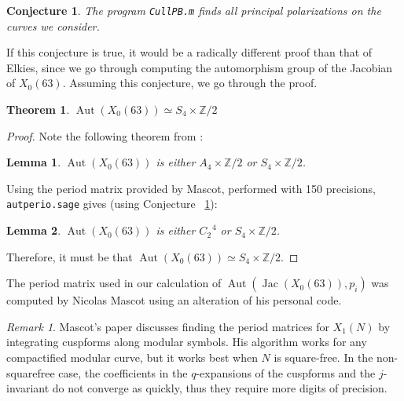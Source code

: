 \documentclass[12pt,reqno]{amsart}
\DeclareMathOperator{\Aut}{Aut}
\DeclareMathOperator{\Jac}{Jac}
\newcommand{\Z}{\mathbb{Z}}
\newtheorem*{thm*}{Theorem}
\newtheorem*{lemma*}{Lemma}
\newtheorem{conjecture}[theorem]{Conjecture}
\theoremstyle{definition}
\theoremstyle{remark}
\newtheorem*{remark}{Remark}
\begin{document}

\begin{conjecture} \label{63conj} The program \texttt{CullPB.m} finds all principal polarizations on the curves we consider. \end{conjecture}

If this conjecture is true, it would be a radically different proof than that of Elkies, since we go through computing the automorphism group of the Jacobian of $X_0(63)$. Assuming this conjecture, we go through the proof.

\begin{thm*} $\Aut(X_0(63)) \simeq S_4 \times \Z/2$ \end{thm*} 

\begin{proof} Note the following theorem from \cite{km}: 

\begin{lemma*} $\Aut(X_0(63))$ is either $A_4 \times \Z/2$ or $S_4 \times \Z/2$. 
\end{lemma*}

Using the period matrix provided by Mascot, performed with 150 precisions, \texttt{autperio.sage} gives (using Conjecture ~\ref{63conj}):

\begin{lemma*} $\Aut(X_0(63))$ is either $C_2^{\text{ }4}$ or $S_4 \times \Z/2$.
\end{lemma*}

Therefore, it must be that $\Aut(X_0(63)) \simeq S_4 \times \Z/2$. 
\end{proof} 

\vspace{+10pt} 
The period matrix used in our calculation of $\Aut(\Jac(X_0(63)), p_i)$ was computed by Nicolas Mascot using an alteration of his personal code.

\begin{remark} Mascot's paper \cite{n} discusses finding the period matrices for $X_1(N)$ by integrating cuspforms along modular symbols. His algorithm works for any compactified modular curve, but it works best when $N$ is square-free. In the non-squarefree case, the coefficients in the $q$-expansions of the cuspforms and the $j$-invariant do not converge as quickly, thus they require more digits of precision. \end{remark}
\end{document}
